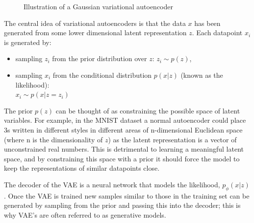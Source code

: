 \documentclass[12pt,a4paper,twoside,openright]{report}
\begin{document}
\begin{figure}[H]
\begin{center}
      \caption{Illustration of a Gaussian variational autoencoder}
      \label{fig:gauss_vae}
  \end{center}
\end{figure}

The central idea of variational autoencoders is that the data $x$ has been generated from some lower dimensional latent
representation $z$. Each datapoint $x_{i}$ is generated by:
\begin{itemize}
  \item sampling $z_{i}$ from the prior distribution over $z$: $z_{i} \sim p(z)$, 
  \item sampling $x_{i}$ from the conditional distribution $p(x|z)$ (known as the likelihood): \\ $x_{i} \sim p(x|z=z_{i})$
\end{itemize}

The prior $p(z)$ can be thought of as constraining the possible space of latent variables. For example, in the MNIST dataset a 
normal autoencoder could place 3s written in different styles in different areas of n-dimensional Euclidean space (where n is the 
dimensionality of $z$) as the latent representation is a vector of unconstrained real numbers. This is detrimental to learning a meaningful 
latent space, and by constraining this space with a prior it should force the model to keep the representations of similar datapoints close.

The decoder of the VAE is a neural network that models the likelihood, $p_\phi(x|z)$. Once the VAE is trained new samples similar to 
those in the training set can be generated by sampling from the prior and passing this into the decoder; this is why VAE's are often
referred to as generative models.
\end{document}
